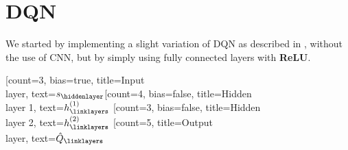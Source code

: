 \section{DQN}
We started by implementing a slight variation of DQN as described in \cite{dqn}, without the use of CNN, but by simply using fully connected layers with \textbf{ReLU}. \\
\begin{neuralnetwork} [nodespacing=10mm, layerspacing=25mm,
			maintitleheight=2.5em, layertitleheight=2.5em,
			height=5, toprow=false, nodesize=17pt, style={},
			title={}, titlestyle={}]
		        \newcommand{\x}[2]{$s_#2$}
		        \newcommand{\y}[2]{$\hat{Q}_#2$}
		        \newcommand{\hfirst}[2]{\small $h^{(1)}_#2$}
		        \newcommand{\hsecond}[2]{\small $h^{(2)}_#2$}
		        [count=3, bias=true, title=Input\\layer, text=\x]
		        \hiddenlayer[count=4, bias=false, title=Hidden\\layer 1, text=\hfirst] \linklayers
		        \hiddenlayer[count=3, bias=false, title=Hidden\\layer 2, text=\hsecond] \linklayers
		        \outputlayer[count=5, title=Output\\layer, text=\y] \linklayers
\end{neuralnetwork}

